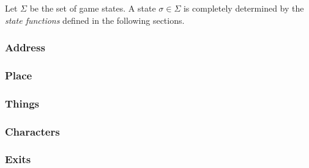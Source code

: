 Let $\Sigma$ be the set of game states. A state $\sigma \in \Sigma$ is
completely determined by the {\em state functions} defined in the
following sections.

\subsubsection{Address}


\subsubsection{Place}


\subsubsection{Things}


\subsubsection{Characters}


\subsubsection{Exits}

